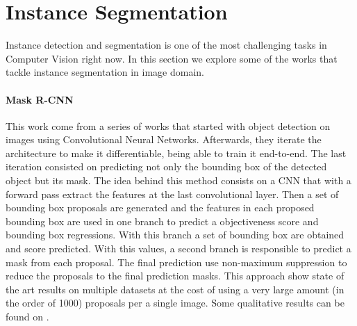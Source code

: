 

\section{Instance Segmentation}
\label{sec:soa:instancesegmentation}

Instance detection and segmentation is one of the most challenging tasks in Computer Vision right now.
In this section we explore some of the works that tackle instance segmentation in image domain.

\paragraph{Mask R-CNN~\maskrcnn}
This work come from a series of works that started with object detection on images using Convolutional Neural Networks.
Afterwards, they iterate the architecture to make it differentiable, being able to train it end-to-end.
The last iteration consisted on predicting not only the bounding box of the detected object but its mask.
The idea behind this method consists on a CNN that with a forward pass extract the features at the last convolutional layer.
Then a set of bounding box proposals are generated and the features in each proposed bounding box are used in one branch to predict a objectiveness score and bounding box regressions.
With this branch a set of bounding box are obtained and score predicted. With this values, a second branch is responsible to predict a mask from each proposal.
The final prediction use non-maximum suppression to reduce the proposals to the final prediction masks.
This approach show state of the art results on multiple datasets at the cost of using a very large amount (in the order of 1000) proposals per a single image.
Some qualitative results can be found on .

